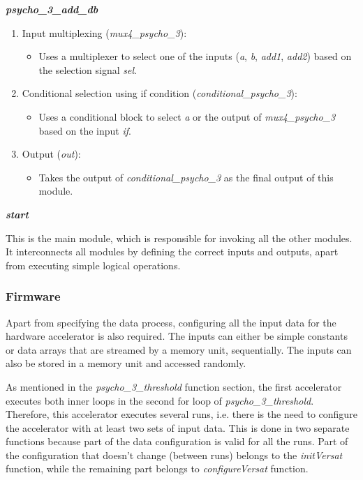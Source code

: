 \vspace{0.5cm}

\textbf{\textit{psycho\_3\_add\_db}}

\begin{enumerate}

\item Input multiplexing (\textit{mux4\_psycho\_3}):
\begin{itemize}
\item Uses a multiplexer to select one of the inputs (\textit{a}, \textit{b}, \textit{add1}, \textit{add2}) based on the selection signal \textit{sel}.
\end{itemize}

\item Conditional selection using if condition (\textit{conditional\_psycho\_3}):
\begin{itemize}
\item Uses a conditional block to select \textit{a} or the output of \textit{mux4\_psycho\_3} based on the input \textit{if}.
\end{itemize}

\item Output (\textit{out}):
\begin{itemize}
\item Takes the output of \textit{conditional\_psycho\_3} as the final output of this module.
\end{itemize}

\end{enumerate}

\vspace{0.5cm}

\textbf{\textit{start}}

This is the main module, which is responsible for invoking all the other modules. It interconnects all modules by defining the correct inputs and outputs, apart from executing simple logical operations.


\subsubsection{Firmware}
Apart from specifying the data process, configuring all the input data for the hardware accelerator is also required. The inputs can either be simple constants or data arrays that are streamed by a memory unit, sequentially. The inputs can also be stored in a memory unit and accessed randomly.

As mentioned in the \textit{psycho\_3\_threshold} function section, the first accelerator executes both inner loops in the second for loop of \textit{psycho\_3\_threshold}.
Therefore, this accelerator executes several runs, i.e. there is the need to configure the accelerator with at least two sets of input data.
This is done in two separate functions because part of the data configuration is valid for all the runs. Part of the configuration that doesn't change (between runs) belongs to the \textit{initVersat} function, while the remaining part belongs to \textit{configureVersat} function.

